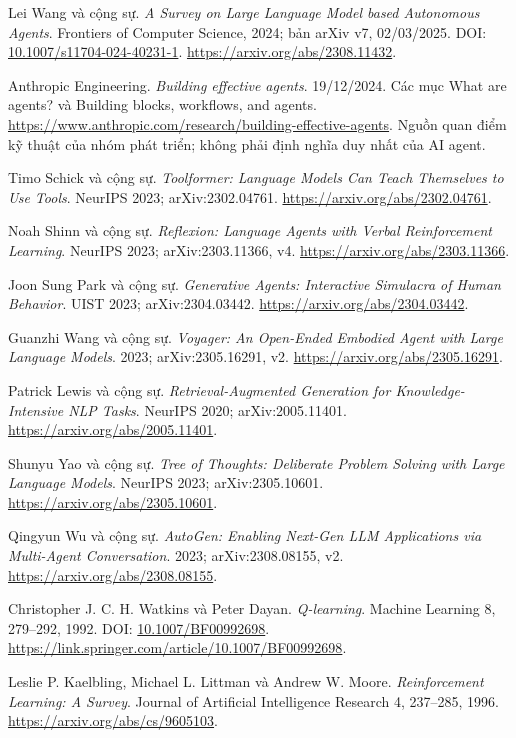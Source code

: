  Lei Wang và cộng sự.
\emph{A Survey on Large Language Model based Autonomous Agents}.
Frontiers of Computer Science, 2024; bản arXiv v7, 02/03/2025.
DOI: \href{https://doi.org/10.1007/s11704-024-40231-1}{10.1007/s11704-024-40231-1}.
\url{https://arxiv.org/abs/2308.11432}.

 Anthropic Engineering. \emph{Building effective agents}.
19/12/2024. Các mục What are agents? và Building blocks, workflows, and agents.
\url{https://www.anthropic.com/research/building-effective-agents}.
Nguồn quan điểm kỹ thuật của nhóm phát triển; không phải định nghĩa duy nhất của AI agent.

 Timo Schick và cộng sự.
\emph{Toolformer: Language Models Can Teach Themselves to Use Tools}.
NeurIPS 2023; arXiv:2302.04761.
\url{https://arxiv.org/abs/2302.04761}.

 Noah Shinn và cộng sự.
\emph{Reflexion: Language Agents with Verbal Reinforcement Learning}.
NeurIPS 2023; arXiv:2303.11366, v4.
\url{https://arxiv.org/abs/2303.11366}.

 Joon Sung Park và cộng sự.
\emph{Generative Agents: Interactive Simulacra of Human Behavior}.
UIST 2023; arXiv:2304.03442.
\url{https://arxiv.org/abs/2304.03442}.

 Guanzhi Wang và cộng sự.
\emph{Voyager: An Open-Ended Embodied Agent with Large Language Models}.
2023; arXiv:2305.16291, v2.
\url{https://arxiv.org/abs/2305.16291}.

 Patrick Lewis và cộng sự.
\emph{Retrieval-Augmented Generation for Knowledge-Intensive NLP Tasks}.
NeurIPS 2020; arXiv:2005.11401.
\url{https://arxiv.org/abs/2005.11401}.

 Shunyu Yao và cộng sự.
\emph{Tree of Thoughts: Deliberate Problem Solving with Large Language Models}.
NeurIPS 2023; arXiv:2305.10601.
\url{https://arxiv.org/abs/2305.10601}.

 Qingyun Wu và cộng sự.
\emph{AutoGen: Enabling Next-Gen LLM Applications via Multi-Agent Conversation}.
2023; arXiv:2308.08155, v2.
\url{https://arxiv.org/abs/2308.08155}.

 Christopher J. C. H. Watkins và Peter Dayan.
\emph{Q-learning}. Machine Learning 8, 279--292, 1992.
DOI: \href{https://doi.org/10.1007/BF00992698}{10.1007/BF00992698}.
\url{https://link.springer.com/article/10.1007/BF00992698}.

 Leslie P. Kaelbling, Michael L. Littman và Andrew W. Moore.
\emph{Reinforcement Learning: A Survey}. Journal of Artificial Intelligence Research
4, 237--285, 1996. \url{https://arxiv.org/abs/cs/9605103}.


